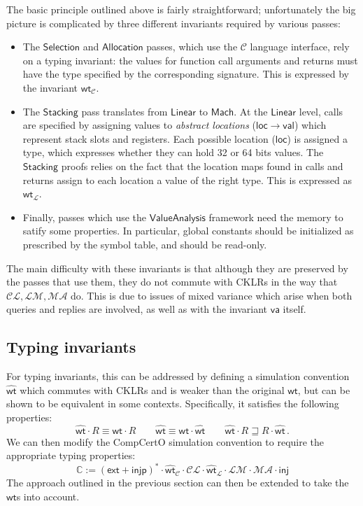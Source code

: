 \documentclass[11pt]{article}
\begin{document}
The basic principle outlined above is fairly straightforward;
unfortunately the big picture is complicated by
three different invariants required by various passes:
\begin{itemize}
  \item The $\mathsf{Selection}$ and $\mathsf{Allocation}$ passes,
    which use the $\mathcal{C}$ language interface,
    rely on a typing invariant:
    the values for function call arguments and returns
    must have the type specified by the corresponding signature.
    This is expressed by the invariant $\mathsf{wt}_\mathcal{\!C}$.
  \item The $\mathsf{Stacking}$ pass translates from
    $\mathsf{Linear}$ to $\mathsf{Mach}$.
    At the $\mathsf{Linear}$ level,
    calls are specified by assigning values to
    \emph{abstract locations} ($\mathsf{loc} \rightarrow \mathsf{val}$)
    which represent stack slots and registers.
    Each possible location ($\mathsf{loc}$) is assigned a type,
    which expresses whether they can hold 32 or 64 bits values.
    The $\mathsf{Stacking}$ proofs relies on the fact that
    the location maps found in calls and returns
    assign to each location a value of the right type.
    This is expressed as $\mathsf{wt}_\mathcal{\!L}$.
  \item Finally, passes which use the $\mathsf{ValueAnalysis}$ framework
    need the memory to satify some properties.
    In particular, global constants should be initialized
    as prescribed by the symbol table,
    and should be read-only.
\end{itemize}

The main difficulty with these invariants
is that although they are preserved by the passes that use them,
they do not commute with CKLRs
in the way that $\mathcal{C\!L}, \mathcal{L\!M}, \mathcal{M\!A}$ do.
This is due to issues of mixed variance
which arise when both queries and replies are involved,
as well as with the invariant $\mathsf{va}$ itself.

\subsection{Typing invariants}

For typing invariants,
this can be addressed by defining a simulation convention
$\hat{\mathsf{wt}}$
which commutes with CKLRs and is weaker than the original $\mathsf{wt}$,
but can be shown to be equivalent in some contexts.
Specifically,
it satisfies the following properties:
\[
  \hat{\mathsf{wt}} \cdot R \equiv \mathsf{wt} \cdot R
  \qquad
  \hat{\mathsf{wt}} \equiv \mathsf{wt} \cdot \hat{\mathsf{wt}}
  \qquad
  \hat{\mathsf{wt}} \cdot R \sqsupseteq R \cdot \hat{\mathsf{wt}}
  \,.
\]
We can then modify the CompCertO simulation convention
to require the appropriate typing properties:
\[
  \mathbb{C} :=
    (\mathsf{ext} + \mathsf{injp})^* \cdot
    \hat{\mathsf{wt}}_\mathcal{\!C} \cdot
    \mathcal{C\!L} \cdot
    \hat{\mathsf{wt}}_\mathcal{\!L} \cdot
    \mathcal{L\!M} \cdot
    \mathcal{M\!A} \cdot
    \mathsf{inj}
\]
The approach outlined in the previous section
can then be extended to take the $\mathsf{wt}$s into account.
\end{document}
